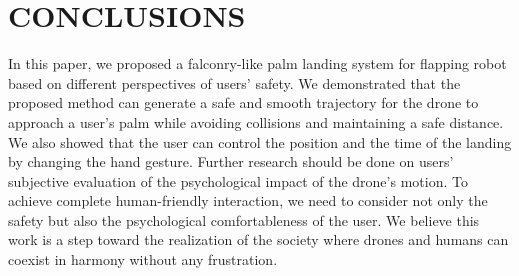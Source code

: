 \section{CONCLUSIONS}

In this paper, we proposed a falconry-like palm landing system for flapping robot based on different perspectives of users' safety.
We demonstrated that the proposed method can generate a safe and smooth trajectory for the drone to approach a user's palm while avoiding collisions and maintaining a safe distance.
We also showed that the user can control the position and the time of the landing by changing the hand gesture.
Further research should be done on users' subjective evaluation of the psychological impact of the drone's motion.
To achieve complete human-friendly interaction, we need to consider not only the safety but also the psychological comfortableness of the user.
We believe this work is a step toward the realization of the society where drones and humans can coexist in harmony without any frustration.